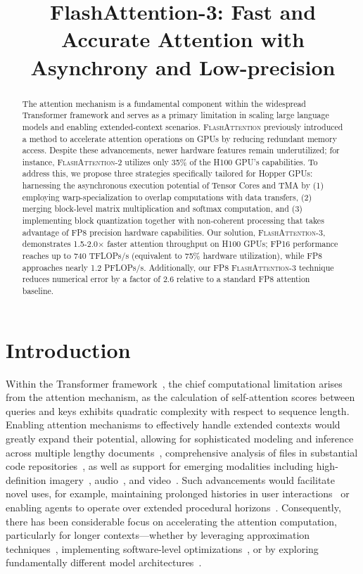 \title{FlashAttention-3: Fast and Accurate Attention with Asynchrony and Low-precision}

\begin{abstract}
The attention mechanism is a fundamental component within the widespread Transformer framework and serves as a primary limitation in scaling large language models and enabling extended-context scenarios. \textsc{FlashAttention} previously introduced a method to accelerate attention operations on GPUs by reducing redundant memory access. Despite these advancements, newer hardware features remain underutilized; for instance, \textsc{FlashAttention-2} utilizes only 35\% of the H100 GPU’s capabilities. To address this, we propose three strategies specifically tailored for Hopper GPUs: harnessing the asynchronous execution potential of Tensor Cores and TMA by (1) employing warp-specialization to overlap computations with data transfers, (2) merging block-level matrix multiplication and softmax computation, and (3) implementing block quantization together with non-coherent processing that takes advantage of FP8 precision hardware capabilities. Our solution, \textsc{FlashAttention-3}, demonstrates 1.5-2.0$\times$ faster attention throughput on H100 GPUs; FP16 performance reaches up to 740 TFLOPs/s (equivalent to 75\% hardware utilization), while FP8 approaches nearly 1.2 PFLOPs/s. Additionally, our FP8 \textsc{FlashAttention-3} technique reduces numerical error by a factor of 2.6 relative to a standard FP8 attention baseline.
\end{abstract}

\section{Introduction}
\label{sec:intro}

Within the Transformer framework~\citep{vaswani2017attention}, the chief computational limitation arises from the attention mechanism, as the calculation of self-attention scores between queries and keys exhibits quadratic complexity with respect to sequence length. Enabling attention mechanisms to effectively handle extended contexts would greatly expand their potential, allowing for sophisticated modeling and inference across multiple lengthy documents~\citep{guo2021longt5,shaham2022scrolls,peng2023yarn}, comprehensive analysis of files in substantial code repositories~\citep{roziere2023code, li2023starcoder}, as well as support for emerging modalities including high-definition imagery~\citep{chen2022scaling}, audio~\citep{gulati2020conformer}, and video~\citep{ho2022video}. Such advancements would facilitate novel uses, for example, maintaining prolonged histories in user interactions~\citep{sun2019bert4rec} or enabling agents to operate over extended procedural horizons~\citep{yao2022react}. Consequently, there has been considerable focus on accelerating the attention computation, particularly for longer contexts—whether by leveraging approximation techniques~\citep{katharopoulos2020transformers,choromanski2020rethinking,tay2020efficient}, implementing software-level optimizations~\citep{rabe2021self,dao2022flashattention,kwon2023efficient}, or by exploring fundamentally different model architectures~\citep{peng2023rwkv,sun2023retentive,gu2023mamba}.

